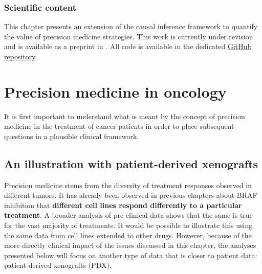 \documentclass[a4paper,12pt,twoside,onecolumn,openright,final,oldfontcommands]{memoir}
\let\BeginKnitrBlock\begin \let\EndKnitrBlock\end
\begin{document}
\BeginKnitrBlock{summarybox}
\subsubsection*{Scientific content}\label{scientific-content-6}

This chapter presents an extension of the causal inference framework to
quantify the value of precision medicine strategies. This work is
currently under revision and is available as a preprint in
\citet{beal2020causal}. All code is available in the dedicated
\href{https://github.com/JonasBeal/Causal_Precision_Medicine}{GitHub
repository}
\EndKnitrBlock{summarybox}

\section{Precision medicine in
oncology}\label{precision-medicine-in-oncology}

It is first important to understand what is meant by the concept of
precision medicine in the treatment of cancer patients in order to place
subsequent questions in a plausible clinical framework.

\subsection{An illustration with patient-derived
xenografts}\label{main-PDX}

Precision medicine stems from the diversity of treatment responses
observed in different tumors. It has already been observed in previous
chapters about BRAF inhibition that \textbf{different cell lines respond
differently to a particular treatment}. A broader analysis of
pre-clinical data shows that the same is true for the vast majority of
treatments. It would be possible to illustrate this using the same data
from cell lines extended to other drugs. However, because of the more
directly clinical impact of the issues discussed in this chapter, the
analyses presented below will focus on another type of data that is
closer to patient data: patient-derived xenografts (PDX).
\end{document}
